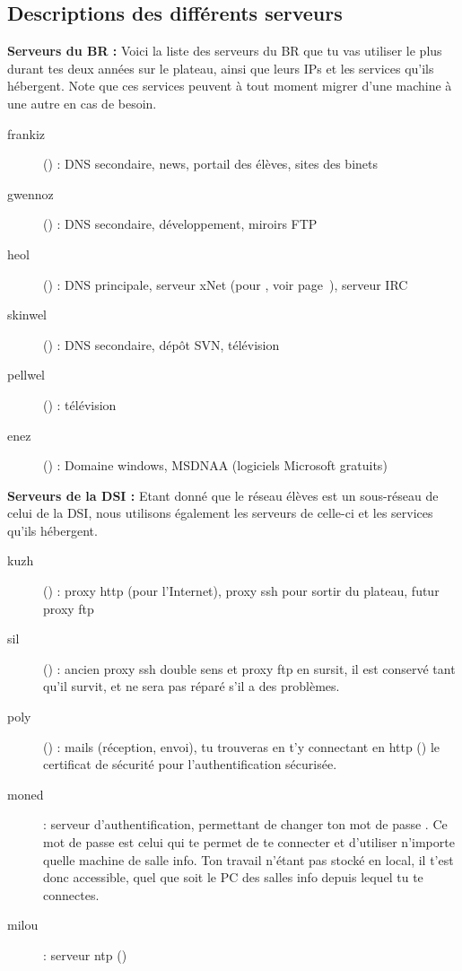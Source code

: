 \subsection{Descriptions des différents serveurs}
{\bf Serveurs du BR :} Voici la liste des serveurs du BR que tu vas
utiliser le plus durant tes deux années sur le plateau, ainsi que
leurs IPs et les services qu'ils hébergent. Note que ces services
peuvent à tout moment migrer d'une machine à une autre en cas de
besoin.


\begin{description}
        \item[frankiz] () : DNS secondaire,
        news, portail des élèves, sites des binets
        \item[gwennoz] () : DNS secondaire,
        développement, miroirs FTP
        \item[heol] () : DNS principale,
        serveur xNet (pour , voir page~\pageref{qrezix}), serveur IRC
        \item[skinwel] () : DNS secondaire,
        dépôt SVN, télévision
	\item[pellwel] () : télévision
    \item[enez] () : Domaine windows, MSDNAA (logiciels Microsoft gratuits)
\end {description}

{\bf Serveurs de la DSI : }Etant donné que le réseau élèves est un
sous-réseau de celui de la DSI, nous utilisons également les
serveurs de celle-ci et les services qu'ils hébergent.

\begin{description}
        \item[kuzh] () : proxy http (pour l'Internet), proxy ssh pour sortir du plateau, futur proxy ftp
        \item[sil] () : ancien proxy ssh double sens et proxy ftp en sursit, il est conservé tant qu'il survit, et ne sera pas réparé s'il a des problèmes.
        \item[poly] () : mails (réception, envoi), tu trouveras en t'y connectant en http () le certificat de sécurité pour l'authentification sécurisée.
        \item[moned] : serveur d'authentification, permettant de
        changer ton mot de passe . Ce mot de passe est celui qui
        te permet de te connecter et d'utiliser n'importe
        quelle machine de salle info. Ton travail n'étant pas stocké
        en local, il t'est donc accessible, quel que soit le PC des salles info depuis
        lequel tu te connectes.
    \item[milou] : serveur ntp ()
\end {description}

